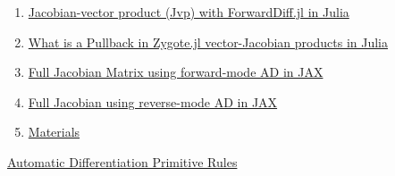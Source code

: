 \documentclass[11pt]{article}
\begin{document}
\begin{enumerate}
	\item  \href{https://mp.weixin.qq.com/s/jMFEBU2sJe-k_USHUsRqbQ}{Jacobian-vector product (Jvp) with ForwardDiff.jl in Julia} %
	\item  \href{https://mp.weixin.qq.com/s/Bgd7OYQdDVkOGf4Syf_veQ}{What is a Pullback in Zygote.jl  vector-Jacobian products in Julia} %
	\item  \href{https://mp.weixin.qq.com/s/ZJTDVi14YLw-HiE4zRoLvg}{Full Jacobian Matrix using forward-mode AD in JAX} %
	\item  \href{https://mp.weixin.qq.com/s/BGN4wbaS9bEIS0H-7eJ-pQ}{Full Jacobian using reverse-mode AD in JAX} %
	\item \href{url}{Materials}
\end{enumerate}


\newpage 

\begin{center}
	\href{https://www.youtube.com/playlist?list=PLISXH-iEM4Jn3SEi07q8MJmDD6BaMWlJE}{Automatic Differentiation Primitive Rules}
\end{center}
\end{document}
